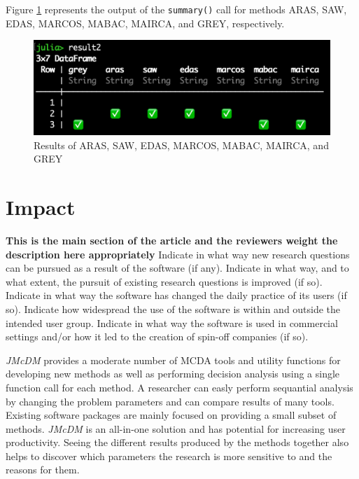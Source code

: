 \documentclass[authoryear,preprint,review,12pt]{elsarticle}
\begin{document}
Figure \ref{fig:imageb} represents the output of the \texttt{summary()} call for methods ARAS, SAW, EDAS, MARCOS, MABAC, MAIRCA, and GREY, respectively.


	\begin{figure}
		\includegraphics[width=\columnwidth]{images/result2}
		\caption{Results of ARAS, SAW, EDAS, MARCOS, MABAC, MAIRCA, and GREY}
		\label{fig:imageb}
		\end{figure}


\section{Impact}
\label{section:impact}
{\color{red}
\textbf{This is the main section of the article and the reviewers weight the description here appropriately}
Indicate in what way new research questions can be pursued as a result of the software (if any).
Indicate in what way, and to what extent, the pursuit of existing research questions is improved (if so).
Indicate in what way the software has changed the daily practice of its users (if so).
Indicate how widespread the use of the software is within and outside the intended user group.
Indicate in what way the software is used in commercial settings and/or how it led to the creation of spin-off companies (if so).
}

\emph{JMcDM} provides a moderate number of MCDA tools and utility functions for developing new methods as well as performing
decision analysis using a single function call for each method. A researcher can easly perform sequantial analysis by changing 
the problem parameters and can compare results of many tools. Existing software packages are mainly focused on providing a 
small subset of methods. \emph{JMcDM} is an all-in-one solution and has potential for increasing user productivity. Seeing 
the different results produced by the methods together also helps to discover which parameters the research is more sensitive 
to and the reasons for them.   
\end{document}
